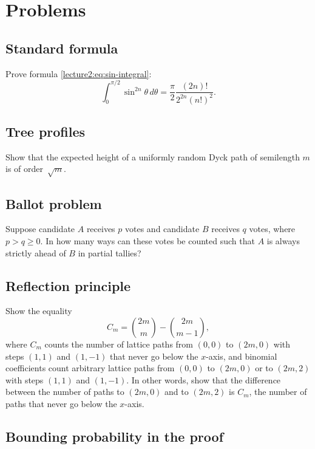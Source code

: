 \documentclass[letterpaper,11pt,oneside,reqno]{book}
\numberwithin{equation}{chapter}  %
\theoremstyle{definition}
\begin{document}
\section{Problems}

\subsection{Standard formula}
\label{lecture2:prob:sin-integral}

Prove formula \eqref{lecture2:eq:sin-integral}:
\begin{equation*}
	\int_0^{\pi/2} \sin^{2n}\theta\, d\theta = \frac{\pi}{2} \frac{(2n)!}{2^{2n} (n!)^2}.
\end{equation*}


\subsection{Tree profiles}
	Show that the expected height of a uniformly random Dyck path of semilength $m$ is of order~$\sqrt{m}$.

\subsection{Ballot problem}


Suppose candidate \(A\) receives \(p\) votes and candidate \(B\) receives \(q\) votes, where \(p > q \geq 0\). In how many ways can these votes be counted such that \(A\) is always strictly ahead of \(B\) in partial tallies?

\subsection{Reflection principle}
\label{lecture2:prob:reflection-principle}

Show the equality
\begin{equation*}
	C_m=\binom{2m}{m}-\binom{2m}{m-1},
\end{equation*}
where $C_m$ counts the number of lattice paths
from $(0,0)$ to $(2m,0)$ with steps $(1,1)$ and $(1,-1)$
that never go below the $x$-axis,
and binomial coefficients count
arbitrary lattice paths from $(0,0)$ to $(2m,0)$ or
to $(2m,2)$ with steps $(1,1)$ and $(1,-1)$.
In other words, show that the difference between the number of paths
to $(2m,0)$ and to $(2m,2)$ is $C_m$, the number of paths
that never go below the $x$-axis.

\subsection{Bounding probability in the proof}
\label{lecture2:prob:chebyshev-like}
\end{document}
